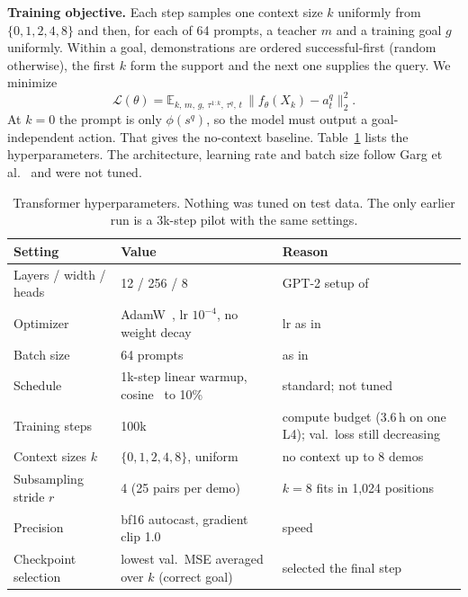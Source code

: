 \textbf{Training objective.} Each step samples one context size $k$ uniformly from $\{0,1,2,4,8\}$ and then, for each of 64
prompts, a teacher $m$ and a training goal $g$ uniformly. Within a goal, demonstrations are ordered successful-first (random
otherwise), the first $k$ form the support and the next one supplies the query. We minimize
\begin{equation}
  \mathcal{L}(\theta) = \mathbb{E}_{k,\,m,\,g,\,\tau^{1:k},\,\tau^q,\,t}\,
  \big\| f_\theta(X_k) - a^q_t \big\|_2^2 .
  \label{eq:loss}
\end{equation}
At $k = 0$ the prompt is only $\phi(s^q)$, so the model must output a goal-independent action. That gives the no-context baseline.
Table~\ref{tab:hparams} lists the hyperparameters. The architecture, learning rate and batch size follow Garg et al.~\cite{garg2022can}
and were not tuned. %

\begin{table}[h]
\centering
\caption{Transformer hyperparameters. Nothing was tuned on test data. The only earlier run is a 3k-step pilot with the same settings.}
\label{tab:hparams}
\begin{tabular}{lll}
\toprule
Setting & Value & Reason \\
\midrule
Layers / width / heads & 12 / 256 / 8 & GPT-2 setup of~\cite{garg2022can} \\
Optimizer & AdamW~\cite{loshchilov2019adamw}, lr $10^{-4}$, no weight decay & lr as in~\cite{garg2022can} \\
Batch size & 64 prompts & as in~\cite{garg2022can} \\
Schedule & 1k-step linear warmup, cosine~\cite{loshchilov2017sgdr} to 10\% & standard; not tuned \\
Training steps & 100k & compute budget (3.6\,h on one L4); val.\ loss still decreasing \\
Context sizes $k$ & $\{0,1,2,4,8\}$, uniform & no context up to 8 demos \\
Subsampling stride $r$ & 4 (25 pairs per demo) & $k = 8$ fits in 1{,}024 positions \\
Precision & bf16 autocast, gradient clip 1.0 & speed \\
Checkpoint selection & lowest val.\ MSE averaged over $k$ (correct goal) & selected the final step \\
\bottomrule
\end{tabular}
\end{table}

